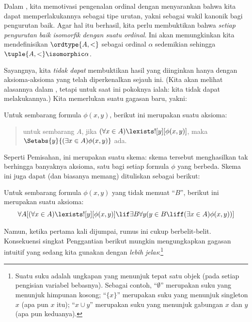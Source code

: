 \documentclass[../../../include/open-logic-section]{subfiles}
\begin{document}

Dalam , kita memotivasi pengenalan ordinal
dengan menyarankan bahwa kita dapat memperlakukannya sebagai tipe urutan,
yakni sebagai wakil kanonik bagi pengurutan baik. Agar hal itu berhasil, kita
perlu membuktikan bahwa \emph{setiap pengurutan baik isomorfik dengan suatu
ordinal}. Ini akan memungkinkan kita mendefinisikan $\ordtype{A, <}$ sebagai
ordinal $\alpha$ sedemikian sehingga $\tuple{A, <} \isomorphic \alpha$.

Sayangnya, kita \emph{tidak dapat} membuktikan hasil yang diinginkan hanya
dengan aksioma-aksioma yang telah diperkenalkan sejauh ini. (Kita akan
melihat alasannya dalam , tetapi untuk saat
ini pokoknya ialah: kita tidak dapat melakukannya.) Kita memerlukan suatu
gagasan baru, yakni:

\begin{axiom}
Untuk sembarang formula $\phi(x, y)$, berikut ini merupakan suatu aksioma:
\begin{quote}
	untuk sembarang $A$, jika $(\forall x \in A)\lexists![y][\phi(x,y)]$,
	maka $\Setabs{y}{(\exists x \in A)\phi(x,y)}$ ada.
\end{quote}
\end{axiom}
\noindent
Seperti Pemisahan, ini merupakan suatu skema: skema tersebut menghasilkan
tak berhingga banyaknya aksioma, satu bagi setiap formula $\phi$ yang berbeda.
Skema ini juga dapat (dan biasanya memang) dituliskan sebagai berikut:

\begin{defish}
Untuk sembarang formula $\phi(x,y)$ yang tidak memuat ``$B$'', berikut ini
merupakan suatu aksioma:
\[
\forall A[(\forall x \in A)\lexists![y][\phi(x,y)] \lif \exists B\forall y (y \in B \liff (\exists x \in A)\phi(x,y))]
\]
\end{defish}

Namun, ketika pertama kali dijumpai, rumus ini cukup berbelit-belit.
Konsekuensi singkat Penggantian berikut mungkin mengungkapkan gagasan
intuitif yang sedang kita gunakan dengan \emph{lebih jelas}:\footnote{Suatu
suku adalah ungkapan yang menunjuk tepat satu objek (pada setiap pengisian
variabel bebasnya). Sebagai contoh, ``$\emptyset$'' merupakan suku yang
menunjuk himpunan kosong; ``$\{x\}$'' merupakan suku yang menunjuk singleton
$x$ (apa pun $x$ itu); ``$x \cup y$'' merupakan suku yang menunjuk gabungan
$x$ dan $y$ (apa pun keduanya).}
\end{document}
